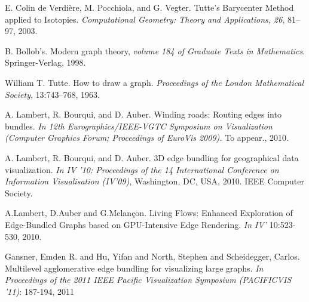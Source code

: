 \begin{thebibliography}{}

 E. Colin de Verdière, M. Pocchiola, and G. Vegter. Tutte's Barycenter Method applied to Isotopies. \emph{Computational Geometry: Theory and Applications, 26}, 81–97, 2003.

 B. Bollob's. Modern graph theory, \emph{volume 184 of Graduate Texts in Mathematics}. Springer-Verlag, 1998.

 William T. Tutte. How to draw a graph. \emph{Proceedings of the London Mathematical Society}, 13:743–768, 1963.

 A. Lambert, R. Bourqui, and D. Auber. Winding roads: Routing edges
into bundles. \emph{In 12th Eurographics/IEEE-VGTC Symposium on
Visualization (Computer Graphics Forum; Proceedings of EuroVis
2009).} To appear., 2010.

 A. Lambert, R. Bourqui, and D. Auber. 3D edge bundling for
geographical data visualization. \emph{In IV ’10: Proceedings of the 14
International Conference on Information Visualisation (IV’09)},
Washington, DC, USA, 2010. IEEE Computer Society.

 A.Lambert, D.Auber and G.Melançon. Living Flows: Enhanced Exploration
of Edge-Bundled Graphs based on GPU-Intensive Edge Rendering. \emph{In IV’}
10:523-530, 2010.

 Gansner, Emden R. and Hu, Yifan and North, Stephen and Scheidegger,
Carlos. Multilevel agglomerative edge bundling for visualizing large
graphs. \emph{In Proceedings of the 2011 IEEE Pacific Visualization
Symposium (PACIFICVIS '11)}: 187-194, 2011






   
\end{thebibliography}
